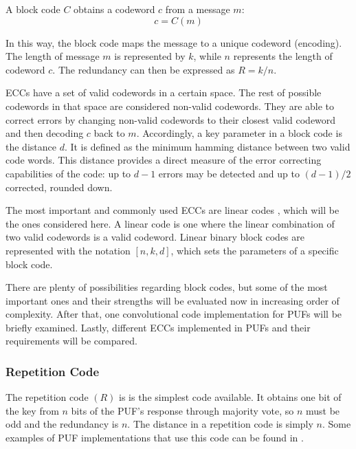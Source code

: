  

A block code $C$ obtains a codeword $c$ from a message $m$:
\begin{equation}
    c=C(m)
\end{equation} 

In this way, the block code maps the message to a unique codeword (encoding). The length of message $m$ is represented by $k$, while $n$ represents the length of codeword $c$. The redundancy can then be expressed as $R=k/n$. 

ECCs have a set of valid codewords in a certain space. The rest of possible codewords in that space are considered non-valid codewords. They are able to correct errors by changing non-valid codewords to their closest valid codeword and then decoding $c$ back to $m$. Accordingly, a key parameter in a block code is the distance $d$. It is defined as the minimum hamming distance between two valid code words. This distance provides a direct measure of the error correcting capabilities of the code: up to $d-1$ errors may be detected and up to $(d-1)/2$ corrected, rounded down.

The most important and commonly used ECCs are linear codes \cite{CastineiraMoreira2006}, which will be the ones considered here.
 A linear code is one where the linear combination of two valid codewords is a valid codeword. Linear binary block codes are represented with the notation $[n,k,d]$, which sets the parameters of a specific block code.
 


There are plenty of possibilities regarding block codes, but some of the most important ones and their strengths will be evaluated now in increasing order of complexity. After that, one convolutional code implementation for PUFs will be briefly examined. Lastly, different ECCs implemented in PUFs and their requirements will be compared. 

\subsubsection{Repetition Code}

% 
The repetition code $(R)$ is is the simplest code available. It obtains one bit of the key from $n$ bits of the PUF's response through majority vote, so $n$ must be odd and the redundancy is $n$. The distance in a repetition code is simply $n$. Some examples of PUF implementations that use this code can be found in \cite{Bohm2011,Maes2009,Martinez-Rodriguez2018}.
 
